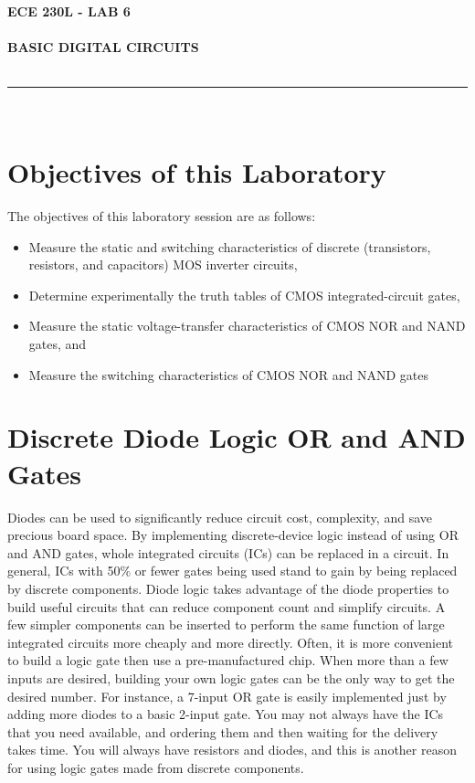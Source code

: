 \documentclass[12pt]{../manual}
\begin{document}
\begin{center}
\textbf{\huge ECE 230L - LAB 6}\\~\\
\textbf{\large BASIC DIGITAL CIRCUITS}\\~\\
\rule{6.5in}{0.5mm}\\
\end{center}

\tableofcontents

\listoffigures

\newpage
%
\section{Objectives of this Laboratory}
The objectives of this laboratory session are as follows:
\begin{itemize}
\item Measure the static and switching characteristics of discrete (transistors, resistors, and
capacitors) MOS inverter circuits,
\item Determine experimentally the truth tables of CMOS integrated-circuit gates,
\item Measure the static voltage-transfer characteristics of CMOS NOR and NAND gates,
and
\item Measure the switching characteristics of CMOS NOR and NAND gates
\end{itemize}

\section{Discrete Diode Logic OR and AND Gates}
Diodes can be used to significantly reduce circuit cost, complexity, and save precious board space. By implementing discrete-device logic instead of using OR and AND gates, whole integrated circuits (ICs) can be replaced in a circuit. In general, ICs with 50\% or fewer gates being used stand to gain by being replaced by discrete components. Diode logic takes advantage of the diode properties to build useful circuits that can reduce component count and simplify circuits. A few simpler components can be inserted to perform the same function of large integrated circuits more cheaply and more directly. Often, it is more convenient to build a logic gate then use a pre-manufactured chip. When more than a few inputs are desired, building your own logic gates can be the only way to get the desired number. For instance, a 7-input OR gate is easily implemented just by adding more diodes to a basic 2-input gate. You may not always have the ICs that you need available, and ordering them and then waiting for the delivery takes time. You will always have resistors and diodes, and this is another reason for using logic gates made from discrete components.
\end{document}
